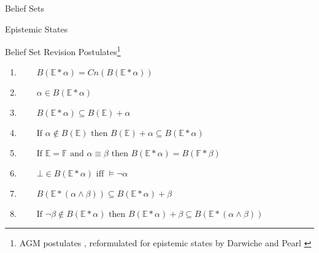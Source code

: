 \documentclass[11pt]{beamer}
\begin{document}
\begin{frame}{Belief Sets}
    \note{
        \begin{itemize}
            \item 
        \end{itemize}
    }
\end{frame}

\begin{frame}{Epistemic States}
\end{frame}

\begin{frame}{Belief Set Revision Postulates\footnote{AGM postulates \cite{Alchourron1985}, reformulated for epistemic states by Darwiche and Pearl \cite{Darwiche1997}}}
    \begin{enumerate}[wide=0pt, widest=99,leftmargin=\parindent,label = ($\mathbb{E}\!*\!\arabic*$)]
        \item\label{E1} $\qquad B(\mathbb{E}\ast\alpha) = Cn(B(\mathbb{E}\ast\alpha))$
        \item\label{E2} $\qquad \alpha \in B(\mathbb{E}\ast\alpha)$
        \item\label{E3} $\qquad B(\mathbb{E}\ast\alpha)  \subseteq B(\mathbb{E})+\alpha$
        \item\label{E4} $\qquad \textrm{If } \alpha \notin B(\mathbb{E}) \textrm{ then } B(\mathbb{E}) + \alpha \subseteq B(\mathbb{E} \ast \alpha)$
        \item\label{E5} $\qquad \textrm{If } \mathbb{E} = \mathbb{F} \textrm{ and } \alpha \equiv \beta \textrm{ then } B(\mathbb{E} \ast \alpha) = B(\mathbb{F} \ast \beta)$
        \item\label{E6} $\qquad \bot \in B(\mathbb{E} \ast \alpha) \textrm{ iff } \models \neg \alpha$
        \item\label{E7} $\qquad B(\mathbb{E} \ast (\alpha \wedge \beta)) \subseteq B(\mathbb{E} \ast \alpha) + \beta$
        \item\label{E8} $\qquad \textrm{If } \neg \beta \notin B(\mathbb{E} \ast \alpha) \textrm{ then } B(\mathbb{E} \ast \alpha) + \beta \subseteq B(\mathbb{E} \ast (\alpha \wedge \beta))$
    \end{enumerate}
    
    \note{
        \begin{itemize}
            \item 
        \end{itemize}
    }
\end{frame}
\end{document}
